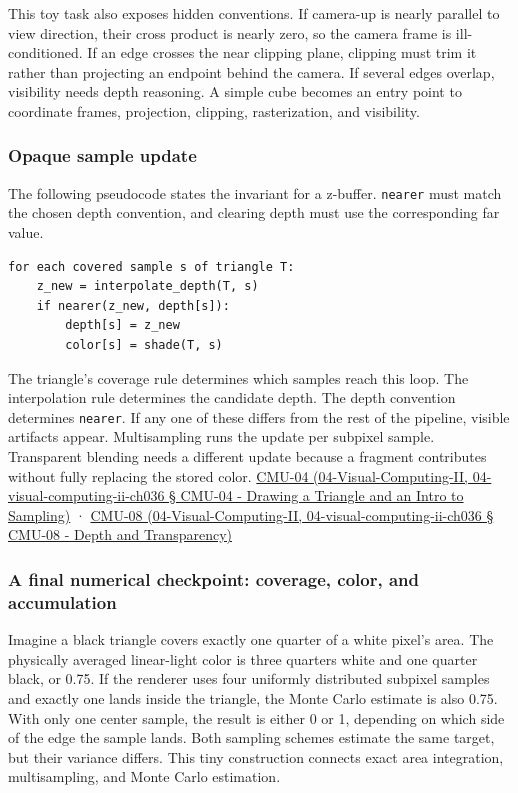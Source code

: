 This toy task also exposes hidden conventions. If camera-up is nearly parallel to view direction, their cross product is nearly zero, so the camera frame is ill-conditioned. If an edge crosses the near clipping plane, clipping must trim it rather than projecting an endpoint behind the camera. If several edges overlap, visibility needs depth reasoning. A simple cube becomes an entry point to coordinate frames, projection, clipping, rasterization, and visibility.

\subsubsection{Opaque sample update}\label{opaque-sample-update}

The following pseudocode states the invariant for a z-buffer. \texttt{nearer} must match the chosen depth convention, and clearing depth must use the corresponding far value.

\begin{verbatim}
for each covered sample s of triangle T:
    z_new = interpolate_depth(T, s)
    if nearer(z_new, depth[s]):
        depth[s] = z_new
        color[s] = shade(T, s)
\end{verbatim}

The triangle's coverage rule determines which samples reach this loop. The interpolation rule determines the candidate depth. The depth convention determines \texttt{nearer}. If any one of these differs from the rest of the pipeline, visible artifacts appear. Multisampling runs the update per subpixel sample. Transparent blending needs a different update because a fragment contributes without fully replacing the stored color. \href{}{CMU-04 (04-Visual-Computing-II, 04-visual-computing-ii-ch036 § CMU-04 - Drawing a Triangle and an Intro to Sampling)} · \href{}{CMU-08 (04-Visual-Computing-II, 04-visual-computing-ii-ch036 § CMU-08 - Depth and Transparency)}

\subsubsection{A final numerical checkpoint: coverage, color, and accumulation}\label{a-final-numerical-checkpoint-coverage-color-and-accumulation}

Imagine a black triangle covers exactly one quarter of a white pixel's area. The physically averaged linear-light color is three quarters white and one quarter black, or 0.75. If the renderer uses four uniformly distributed subpixel samples and exactly one lands inside the triangle, the Monte Carlo estimate is also 0.75. With only one center sample, the result is either 0 or 1, depending on which side of the edge the sample lands. Both sampling schemes estimate the same target, but their variance differs. This tiny construction connects exact area integration, multisampling, and Monte Carlo estimation.

